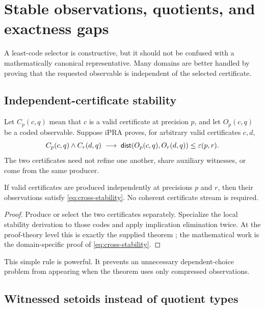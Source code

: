 \section{Stable observations, quotients, and exactness gaps}

A least-code selector is constructive, but it should not be confused with a
mathematically canonical representative.  Many domains are better handled by
proving that the requested observable is independent of the selected
certificate.

\subsection{Independent-certificate stability}

Let \(C_p(c,q)\) mean that \(c\) is a valid certificate at precision \(p\),
and let \(O_p(c,q)\) be a coded observable.  Suppose iPRA proves, for arbitrary
valid certificates \(c,d\),
\begin{equation}
  C_p(c,q)\wedge C_r(d,q)
  \;\longrightarrow\;
  \mathsf{dist}(O_p(c,q),O_r(d,q))\le \varepsilon(p,r).
  \label{eq:cross-stability}
\end{equation}
The two certificates need not refine one another, share auxiliary witnesses,
or come from the same producer.

\begin{theorem}
If valid certificates are produced independently at precisions \(p\) and
\(r\), then their observations satisfy \eqref{eq:cross-stability}.  No coherent
certificate stream is required.
\end{theorem}

\begin{proof}
Produce or select the two certificates separately.  Specialize the local
stability derivation to those codes and apply implication elimination twice.
At the proof-theory level this is exactly the supplied theorem
; the mathematical work is the domain-specific
proof of \eqref{eq:cross-stability}.
\end{proof}

This simple rule is powerful.  It prevents an unnecessary dependent-choice
problem from appearing when the theorem uses only compressed observations.

\subsection{Witnessed setoids instead of quotient types}

